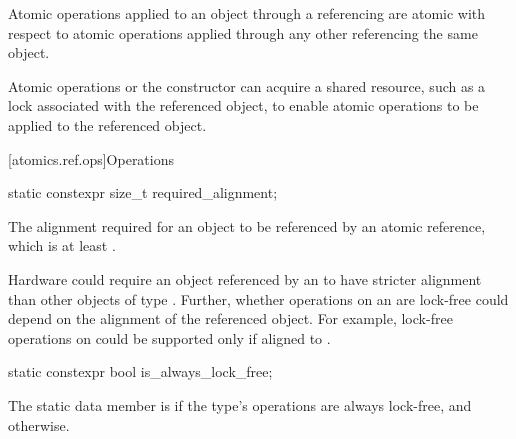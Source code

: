 \pnum
Atomic operations applied to an object
through a referencing  are atomic with respect to
atomic operations applied through any other 
referencing the same object.
\begin{note}
Atomic operations or the  constructor can acquire
a shared resource, such as a lock associated with the referenced object,
to enable atomic operations to be applied to the referenced object.
\end{note}

[atomics.ref.ops]{Operations}

%
%
%
%
\begin{itemdecl}
static constexpr size_t required_alignment;
\end{itemdecl}

\begin{itemdescr}
\pnum
The alignment required for an object to be referenced by an atomic reference,
which is at least .

\pnum
\begin{note}
Hardware could require an object
referenced by an 
to have stricter alignment
than other objects of type .
Further, whether operations on an 
are lock-free could depend on the alignment of the referenced object.
For example, lock-free operations on 
could be supported only if aligned to .
\end{note}
\end{itemdescr}

%
%
%
%
\begin{itemdecl}
static constexpr bool is_always_lock_free;
\end{itemdecl}

\begin{itemdescr}
\pnum
The static data member  is 
if the  type's operations are always lock-free,
and  otherwise.
\end{itemdescr}

